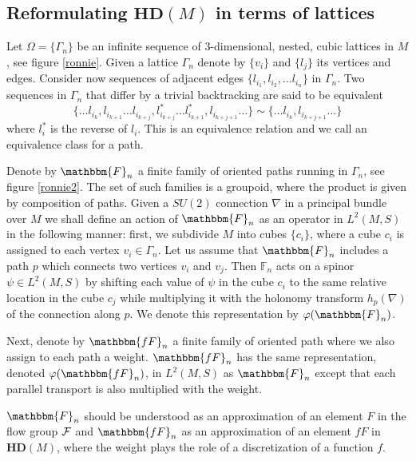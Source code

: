 \documentclass[12pt]{article}
\def\G{\Gamma}
\def\OO{\Omega}
\def\cf{{\cal F}}
\begin{document}
\subsection{Reformulating $\mathbf{HD}(M) $ in terms of lattices}
\label{sec51}

Let $\OO=\{\G_n\}$ be an infinite sequence of 3-dimensional, nested, cubic lattices in $M$, see figure \ref{ronnie}. Given a lattice $\G_n$ denote by $\{v_i\}$ and $\{l_j\}$ its vertices and edges. %
Consider now sequences of adjacent edges $\{l_{i_1}, l_{i_2},\ldots l_{i_n}\}$ in $\G_n$.  Two sequences in $\G_n$ that differ by a trivial backtracking are said to be equivalent
$$
\{\ldots l_{i_k},l_{i_{k+1}}\ldots l_{i_{k+j}} ,l^*_{i_{k+j}} \ldots l^*_{i_{k+1}},l_{i_{k+j+1}} \ldots \}\sim\{\ldots l_{i_k},l_{i_{k+j+1}} \ldots \}
$$
where $l_i^*$ is the reverse of $l_i$. This is an equivalence relation and we call an equivalence class for a path.

Denote by $\mathbbm{F}_n$ a finite family of oriented paths running in $\G_n$, see figure \ref{ronnie2}. The set of such families is a groupoid, where the product is given by composition of paths. Given a $SU(2)$ connection $\nabla$ in a principal bundle over $M$ we shall define an action of $\mathbbm{F}_n$ as an operator in $L^2(M,S)$ in the following manner: first, we subdivide $M$ into cubes $\{c_i\}$, where a cube $c_i$ is assigned to each vertex $v_i\in\G_n$. Let us assume that $\mathbbm{F}_n$ includes a path $p$ which connects two vertices $v_i$ and $v_j$. Then $\mathds{F}_n$ acts on a spinor $\psi\in L^2(M,S)$ by shifting each value of $\psi$ in the cube $c_i$ to the same relative location in the cube $c_j$ while multiplying it with the holonomy transform $h_p(\nabla)$ of the connection along $p$. We denote this representation by $\varphi(\mathbbm{F}_n)$.

Next, denote by $\mathbbm{fF}_n$ a finite family of oriented path where we also assign to each path a weight. $\mathbbm{fF}_n$ has the same representation, denoted $\varphi(\mathbbm{fF}_n)$, in $L^2(M,S)$ as $\mathbbm{F}_n$ except that each parallel transport is also multiplied with the weight.

 $\mathbbm{F}_n$ should be understood as an approximation of an element $F$ in the flow group $\cf$ and $\mathbbm{fF}_n$ as an approximation of an element $fF$ in  $ \mathbf{HD}(M) $, where the weight plays the role of a discretization of a function $f$.
\end{document}
